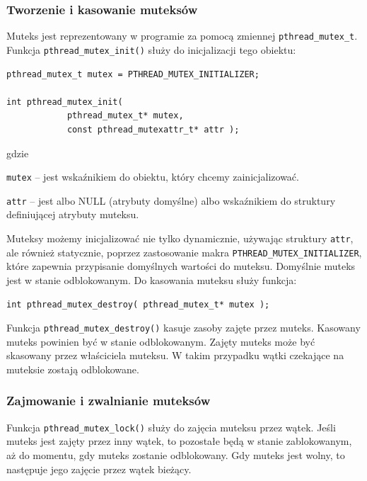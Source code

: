 \subsubsection{Tworzenie i kasowanie muteksów}

Muteks jest reprezentowany w programie za pomocą zmiennej \lstinline[style=MyCStyle]{pthread_mutex_t}. Funkcja \lstinline[style=MyCStyle]{pthread_mutex_init()} służy do inicjalizacji tego obiektu:

\begin{lstlisting}[style=MyCStyle]
pthread_mutex_t mutex = PTHREAD_MUTEX_INITIALIZER;

int pthread_mutex_init(
            pthread_mutex_t* mutex,
            const pthread_mutexattr_t* attr );
\end{lstlisting}
gdzie
\begin{myitemize}
\item \lstinline[style=MyCStyle]{mutex} -- jest wskaźnikiem do obiektu, który chcemy zainicjalizować.
\item \lstinline[style=MyCStyle]{attr} -- jest albo NULL (atrybuty domyślne) albo wskaźnikiem do struktury definiującej atrybuty muteksu.
\end{myitemize}

Muteksy możemy inicjalizować nie tylko dynamicznie, używając struktury \lstinline[style=MyCStyle]{attr}, ale również  statycznie, poprzez zastosowanie makra \lstinline[style=MyCStyle]{PTHREAD_MUTEX_INITIALIZER}, które zapewnia przypisanie domyślnych wartości do muteksu. Domyślnie muteks jest w stanie odblokowanym.
Do kasowania muteksu służy funkcja:

\begin{lstlisting}[style=MyCStyle]
int pthread_mutex_destroy( pthread_mutex_t* mutex );
\end{lstlisting}

Funkcja \lstinline[style=MyCStyle]{pthread_mutex_destroy()} kasuje zasoby zajęte przez muteks. Kasowany muteks powinien być w stanie odblokowanym. Zajęty muteks może być skasowany przez właściciela muteksu. W takim przypadku wątki czekające na muteksie zostają odblokowane.

\subsubsection{Zajmowanie i zwalnianie muteksów}

Funkcja  \lstinline[style=MyCStyle]{pthread_mutex_lock()} służy do zajęcia muteksu przez wątek. Jeśli muteks jest zajęty przez inny wątek, to pozostałe będą w stanie zablokowanym, aż do momentu, gdy muteks zostanie odblokowany. Gdy muteks jest wolny, to następuje jego zajęcie przez wątek bieżący.

